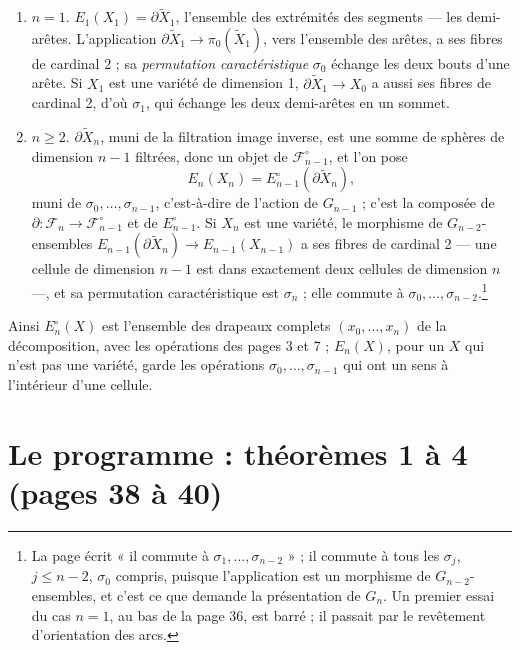 \documentclass[11pt,a4paper]{article}
\begin{document}
\begin{enumerate}
  \item[(1)] $n = 1$. $E_1(X_1) = \partial\widetilde{X}_1$, l'ensemble des
  extrémités des segments --- les demi-arêtes. L'application
  $\partial\widetilde{X}_1 \to \pi_0(\widetilde{X}_1)$, vers l'ensemble des
  arêtes, a ses fibres de cardinal 2 ; sa \emph{permutation caractéristique}
  $\sigma_0$ échange les deux bouts d'une arête. Si $X_1$ est une variété de
  dimension 1, $\partial\widetilde{X}_1 \to X_0$ a aussi ses fibres de
  cardinal 2, d'où $\sigma_1$, qui échange les deux demi-arêtes en un sommet.
  \item[(2)] $n \geqslant 2$. $\partial\widetilde{X}_n$, muni de la filtration
  image inverse, est une somme de sphères de dimension $n-1$ filtrées, donc un
  objet de $\mathcal{F}_{n-1}^\circ$, et l'on pose
  \[
    E_n(X_n) = E_{n-1}^\circ(\partial\widetilde{X}_n) ,
  \]
  muni de $\sigma_0, \ldots, \sigma_{n-1}$, c'est-à-dire de l'action de
  $G_{n-1}$ ; c'est la composée de $\partial : \mathcal{F}_n \to
  \mathcal{F}_{n-1}^\circ$ et de $E_{n-1}^\circ$. Si $X_n$ est une variété, le
  morphisme de $G_{n-2}$-ensembles $E_{n-1}(\partial\widetilde{X}_n) \to
  E_{n-1}(X_{n-1})$ a ses fibres de cardinal 2 --- une cellule de dimension
  $n-1$ est dans exactement deux cellules de dimension $n$ ---, et sa
  permutation caractéristique est $\sigma_n$ ; elle commute à $\sigma_0,
  \ldots, \sigma_{n-2}$.\footnote{La page écrit « il commute à $\sigma_1,
  \ldots, \sigma_{n-2}$ » ; il commute à tous les $\sigma_j$, $j \leqslant n -
  2$, $\sigma_0$ compris, puisque l'application est un morphisme de
  $G_{n-2}$-ensembles, et c'est ce que demande la présentation de $G_n$. Un
  premier essai du cas $n = 1$, au bas de la page 36, est barré ; il passait
  par le revêtement d'orientation des arcs.}
\end{enumerate}
Ainsi $E_n^\circ(X)$ est l'ensemble des drapeaux complets $(x_0, \ldots, x_n)$
de la décomposition, avec les opérations des pages 3 et 7 ; $E_n(X)$, pour un
$X$ qui n'est pas une variété, garde les opérations $\sigma_0, \ldots,
\sigma_{n-1}$ qui ont un sens à l'intérieur d'une cellule.

\section*{Le programme : théorèmes 1 à 4 (pages 38 à 40)}
\end{document}
